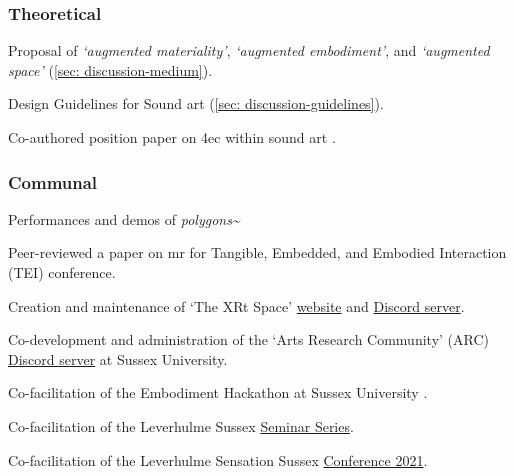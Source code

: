 \begin{SingleSpace}
    \subsubsection{Theoretical}
    \begin{noitemize}
        \item Proposal of \textit{`augmented materiality'}, \textit{`augmented embodiment'}, and \textit{`augmented space'} (\autoref{sec: discussion-medium}).
        \item Design Guidelines for Sound \gls{art} (\autoref{sec: discussion-guidelines}).
        \item Co-authored position paper on \gls{4ec} within sound \gls{art} \citep{bilbow2021}.
    \end{noitemize}
\subsubsection{Communal}
    \begin{noitemize}
        \item Performances and demos of \textit{polygons\textasciitilde{}} \citep{bilbow2022b,bilbow2022a}
        \item Peer-reviewed a paper on \gls{mr} for Tangible, Embedded, and Embodied Interaction (TEI) conference.
        \item Creation and maintenance of `The XRt Space' \href{https://sambilbow.github.io/thexrtspace}{website} and \href{https://discord.gg/p3MmURSBV3}{Discord server}.
        \item Co-development and administration of the `Arts Research Community' (ARC) \href{https://discord.gg/8dfsZDgwN8}{Discord server} at Sussex University. 
        \item Co-facilitation of the Embodiment Hackathon at Sussex University \citep{bonarjee2022}.
        \item Co-facilitation of the Leverhulme Sussex \href{https://www.sussex.ac.uk/sensation/training/seminars}{Seminar Series}.
        \item Co-facilitation of the Leverhulme Sensation Sussex \href{https://www.sussex.ac.uk/sensation/training/conference-2021}{Conference 2021}.
    \end{noitemize}
\end{SingleSpace}




